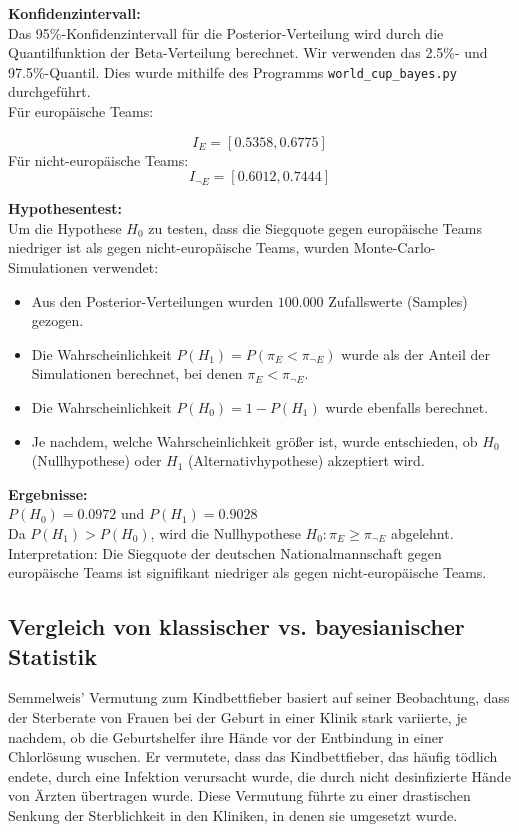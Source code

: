 \documentclass[a4paper,12pt]{article}
\begin{document}
\textbf{Konfidenzintervall:} \\
Das 95\%-Konfidenzintervall für die Posterior-Verteilung wird durch die Quantilfunktion der Beta-Verteilung berechnet. Wir verwenden das 2.5\%- und 97.5\%-Quantil.
Dies wurde mithilfe des Programms \texttt{world\_cup\_bayes.py} durchgeführt. \\
Für europäische Teams:

\[
I_E = [0.5358, 0.6775]
\]
Für nicht-europäische Teams:
\[
I_{\neg E} = [0.6012, 0.7444]
\]

\textbf{Hypothesentest:} \\
Um die Hypothese \(H_0\) zu testen, dass die Siegquote gegen europäische Teams niedriger ist als gegen nicht-europäische Teams, wurden Monte-Carlo-Simulationen verwendet:

\begin{itemize}
    \item Aus den Posterior-Verteilungen wurden \( 100{.}000 \) Zufallswerte (Samples) gezogen.
    \item Die Wahrscheinlichkeit \( P(H_1) = P(\pi_E < \pi_{\neg E}) \) wurde als der Anteil der Simulationen berechnet, bei denen \( \pi_E < \pi_{\neg E} \).
    \item Die Wahrscheinlichkeit \( P(H_0) = 1 - P(H_1) \) wurde ebenfalls berechnet.
    \item Je nachdem, welche Wahrscheinlichkeit größer ist, wurde entschieden, ob \( H_0 \) (Nullhypothese) oder \( H_1 \) (Alternativhypothese) akzeptiert wird.
\end{itemize}

\textbf{Ergebnisse:} \\
\( P(H_0) = 0.0972 \) und \( P(H_1) = 0.9028 \) \\
Da \( P(H_1) > P(H_0) \), wird die Nullhypothese \( H_0 : \pi_E \geq \pi_{\neg E} \) abgelehnt. \\
Interpretation: Die Siegquote der deutschen Nationalmannschaft gegen europäische Teams ist signifikant niedriger als gegen nicht-europäische Teams.
\newpage

\subsection{Vergleich von klassischer vs. bayesianischer Statistik}
Semmelweis' Vermutung zum Kindbettfieber basiert auf seiner Beobachtung, dass der Sterberate von Frauen bei der Geburt 
in einer Klinik stark variierte, je nachdem, ob die Geburtshelfer ihre Hände vor der Entbindung in einer Chlorlösung wuschen. 
Er vermutete, dass das Kindbettfieber, das häufig tödlich endete, durch eine Infektion verursacht wurde, 
die durch nicht desinfizierte Hände von Ärzten übertragen wurde. Diese Vermutung führte zu einer 
drastischen Senkung der Sterblichkeit in den Kliniken, in denen sie umgesetzt wurde.
\parencite[3]{StatistikKlassischOderBayes}
\end{document}

